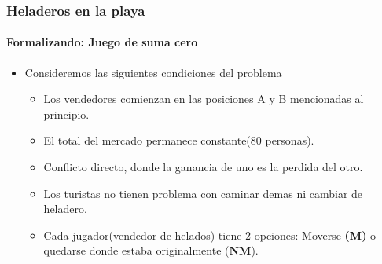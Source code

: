 \documentclass{beamer}
\begin{document}
\begin{frame}
  \frametitle{Heladeros en la playa}
  \framesubtitle{Formalizando: Juego de suma cero}
  \begin{itemize}
    \setlength{\itemsep}{4pt}
    \item Consideremos las siguientes condiciones del problema
    \begin{itemize}
      \item Los vendedores comienzan en las posiciones A y B mencionadas al principio.
      \pause
      \item El total del mercado permanece constante(80 personas).
      \pause
      \item Conflicto directo, donde la ganancia de uno es la perdida del otro.
      \pause
      \item Los turistas no tienen problema con caminar demas ni cambiar de heladero.
      \pause
      \item Cada jugador(vendedor de helados) tiene 2 opciones: Moverse \textbf{(M)} o quedarse donde estaba originalmente (\textbf{NM}). 
    \end{itemize}
  \end{itemize}
\end{frame}
\end{document}
